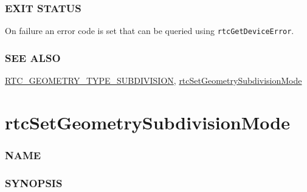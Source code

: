 \subsubsection{EXIT STATUS}\label{exit-status}

On failure an error code is set that can be queried using
\texttt{rtcGetDeviceError}.

\subsubsection{SEE ALSO}\label{see-also}

\hyperref[rtc_geometry_type_subdivision]{RTC\_GEOMETRY\_TYPE\_SUBDIVISION},
\hyperref[rtcsetgeometrysubdivisionmode]{rtcSetGeometrySubdivisionMode}

\pagebreak

\section{rtcSetGeometrySubdivisionMode}\label{rtcsetgeometrysubdivisionmode}

\subsubsection{NAME}\label{name}

\begin{Shaded}
\begin{Highlighting}[]
\OperatorTok{{-}}
\end{Highlighting}
\end{Shaded}

\subsubsection{SYNOPSIS}\label{synopsis}

\begin{Shaded}
\begin{Highlighting}[]

\OperatorTok{(}
\OperatorTok{,}
   \OperatorTok{,}
\OperatorTok{);}
\end{Highlighting}
\end{Shaded}

